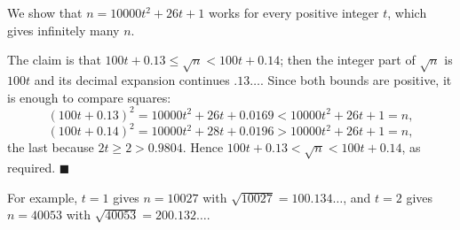 We show that $n=10000t^2+26t+1$ works for every positive integer $t$, which gives infinitely many $n$.

The claim is that $100t+0.13\le\sqrt n<100t+0.14$; then the integer part of $\sqrt n$ is $100t$ and its decimal expansion continues $.13\ldots$. Since both bounds are positive, it is enough to compare squares:
\[
(100t+0.13)^2=10000t^2+26t+0.0169<10000t^2+26t+1=n,
\]
\[
(100t+0.14)^2=10000t^2+28t+0.0196>10000t^2+26t+1=n,
\]
the last because $2t\ge2>0.9804$. Hence $100t+0.13<\sqrt n<100t+0.14$, as required. $\blacksquare$

For example, $t=1$ gives $n=10027$ with $\sqrt{10027}=100.134\ldots$, and $t=2$ gives $n=40053$ with $\sqrt{40053}=200.132\ldots$.
